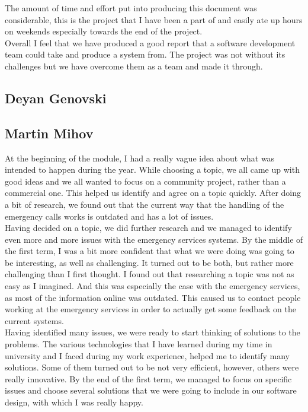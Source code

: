 \documentclass[]{article}
\begin{document}
The amount of time and effort put into producing this document was considerable, this is the project that I have been a part of and easily ate up hours on weekends especially towards the end of the project.\\

Overall I feel that we have produced a good report that a software development team could take and produce a system from. The project was not without its challenges but we have overcome them as a team and made it through.

    \pagebreak
    \subsection{Deyan Genovski}
    \pagebreak
    \subsection{Martin Mihov}
    At the beginning of the module, I had a really vague idea about what was intended to happen during the year. While choosing a topic, we all came up with good ideas and we all wanted to focus on a community project, rather than a commercial one. This helped us identify and agree on a topic quickly. After doing a bit of research, we found out that the current way that the handling of the emergency calls works is outdated and has a lot of issues.\\

Having decided on a topic, we did further research and we managed to identify even more and more issues with the emergency services systems. By the middle of the first term, I was a bit more confident that what we were doing was going to be interesting, as well as challenging. It turned out to be both, but rather more challenging than I first thought. I found out that researching a topic was not as easy as I imagined. And this was especially the case with the emergency services, as most of the information online was outdated. This caused us to contact people working at the emergency services in order to actually get some feedback on the current systems.\\

Having identified many issues, we were ready to start thinking of solutions to the problems. The various technologies that I have learned during my time in university and I faced during my work experience, helped me to identify many solutions. Some of them turned out to be not very efficient, however, others were really innovative. By the end of the first term, we managed to focus on specific issues and choose several solutions that we were going to include in our software design, with which I was really happy.\\
\end{document}
